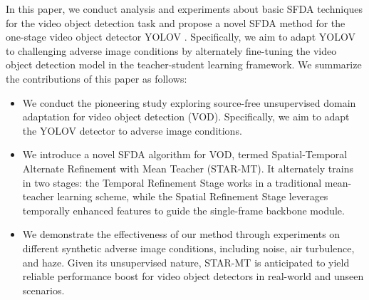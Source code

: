 In this paper, we conduct analysis and experiments about basic SFDA techniques for the video object detection task and propose a novel SFDA method for the one-stage video object detector YOLOV \cite{shi2023yolov}. Specifically, we aim to adapt YOLOV \cite{shi2023yolov} to challenging adverse image conditions by alternately fine-tuning the video object detection model in the teacher-student learning framework. We summarize the contributions of this paper as follows:
\begin{itemize}
    \item We conduct the pioneering study exploring source-free unsupervised domain adaptation for video object detection (VOD). Specifically, we aim to adapt the YOLOV detector to adverse image conditions.
    \item We introduce a novel SFDA algorithm for VOD, termed Spatial-Temporal Alternate Refinement with Mean Teacher (STAR-MT). It alternately trains in two stages: the Temporal Refinement Stage works in a traditional mean-teacher learning scheme, while the Spatial Refinement Stage leverages temporally enhanced features to guide the single-frame backbone module. 
    \item We demonstrate the effectiveness of our method through experiments on different synthetic adverse image conditions, including noise, air turbulence, and haze. Given its unsupervised nature, STAR-MT is anticipated to yield reliable performance boost for video object detectors in real-world and unseen scenarios.

\end{itemize}
